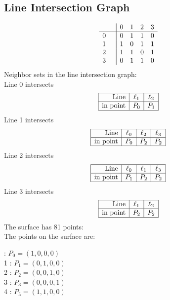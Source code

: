 \documentclass{article}
\begin{document}
{\subsection*{Line Intersection Graph}
{\arraycolsep=1pt
$$
\begin{array}{rr|*{4}r}
 &  & 0 & 1 & 2 & 3\\
\hline
0 &  & 0 & 1 & 1 & 0\\
1 &  & 1 & 0 & 1 & 1\\
2 &  & 1 & 1 & 0 & 1\\
3 &  & 0 & 1 & 1 & 0\\
\end{array}
$$
}%
Neighbor sets in the line intersection graph:\\
Line 0 intersects 
$$
\begin{array}{|r*{2}{|c}|}
\hline
\mbox{Line}  & \ell_{1} & \ell_{2}\\
\hline
\mbox{in point}  & P_{0} & P_{1}\\
\hline
\end{array}
$$
Line 1 intersects 
$$
\begin{array}{|r*{3}{|c}|}
\hline
\mbox{Line}  & \ell_{0} & \ell_{2} & \ell_{3}\\
\hline
\mbox{in point}  & P_{0} & P_{2} & P_{2}\\
\hline
\end{array}
$$
Line 2 intersects 
$$
\begin{array}{|r*{3}{|c}|}
\hline
\mbox{Line}  & \ell_{0} & \ell_{1} & \ell_{3}\\
\hline
\mbox{in point}  & P_{1} & P_{2} & P_{2}\\
\hline
\end{array}
$$
Line 3 intersects 
$$
\begin{array}{|r*{2}{|c}|}
\hline
\mbox{Line}  & \ell_{1} & \ell_{2}\\
\hline
\mbox{in point}  & P_{2} & P_{2}\\
\hline
\end{array}
$$
The surface has 81 points:\\
The points on the surface are:\\
\begin{multicols}{3}
 : $P_{0}=( 1, 0, 0, 0 )$\\
1 : $P_{1}=( 0, 1, 0, 0 )$\\
2 : $P_{2}=( 0, 0, 1, 0 )$\\
3 : $P_{3}=( 0, 0, 0, 1 )$\\
4 : $P_{5}=( 1, 1, 0, 0 )$\\

\end{multicols}}
\end{document}
